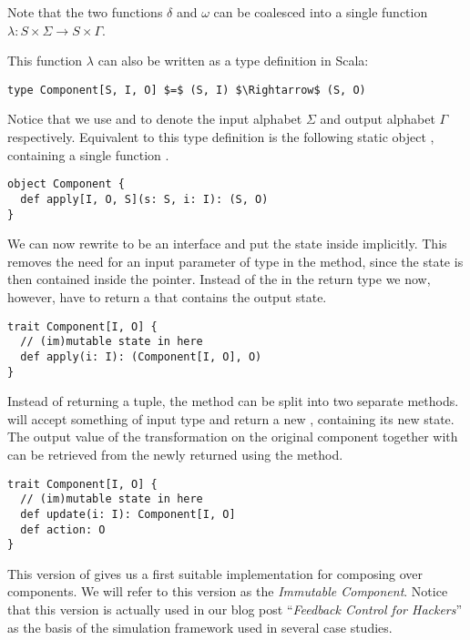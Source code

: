Note that the two functions $\delta$ and $\omega$ can be coalesced into a single function $\lambda: S \times \Sigma \rightarrow S \times \Gamma$.

This function $\lambda$ can also be written as a type definition in Scala:

\begin{lstlisting}[style=InlineScalaStyle]
type Component[S, I, O] $=$ (S, I) $\Rightarrow$ (S, O)
\end{lstlisting}

Notice that we use  and  to denote the input alphabet $\Sigma$ and output alphabet $\Gamma$ respectively. Equivalent to this type definition is the following static object \comp, containing a single function .

\begin{lstlisting}[style=InlineScalaStyle]
object Component {
  def apply[I, O, S](s: S, i: I): (S, O)
}
\end{lstlisting}

We can now rewrite \comp to be an interface and put the state  inside \comp implicitly. This removes the need for an input parameter of type  in the  method, since the state is then contained inside the  pointer. Instead of the  in the return type we now, however, have to return a \comp that contains the output state.

\begin{lstlisting}[style=InlineScalaStyle]
trait Component[I, O] {
  // (im)mutable state in here
  def apply(i: I): (Component[I, O], O)
}
\end{lstlisting}

Instead of returning a tuple, the  method can be split into two separate methods.  will accept something of input type  and return a new \comp, containing its new state. The output value of the transformation on the original component together with  can be retrieved from the newly returned \comp using the  method.

\begin{lstlisting}[style=InlineScalaStyle]
trait Component[I, O] {
  // (im)mutable state in here
  def update(i: I): Component[I, O]
  def action: O
}
\end{lstlisting}

This version of \comp gives us a first suitable implementation for composing over components. We will refer to this version as the \textit{Immutable Component}. Notice that this version is actually used in our blog post ``\textit{Feedback Control for Hackers}'' \cite{heest2015-feedback-for-hackers} as the basis of the simulation framework used in several case studies.

